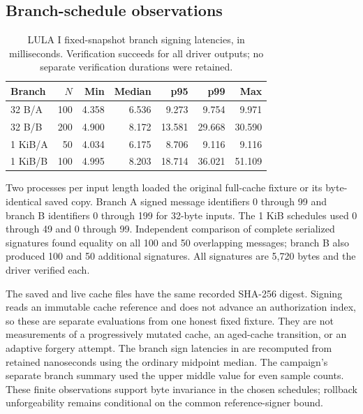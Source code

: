 \subsection{Branch-schedule observations}
\begin{table}[t]
\caption{LULA I fixed-snapshot branch signing latencies, in milliseconds. Verification succeeds for all driver outputs; no separate verification durations were retained.}\label{tab:comparison-branches}
\centering\small\setlength{\tabcolsep}{3pt}
\begin{tabular}{lrrrrrr}\toprule
Branch & $N$ & Min & Median & p95 & p99 & Max\\\midrule
32 B/A & 100 & 4.358 & 6.536 & 9.273 & 9.754 & 9.971\\
32 B/B & 200 & 4.900 & 8.172 & 13.581 & 29.668 & 30.590\\
1 KiB/A & 50 & 4.034 & 6.175 & 8.706 & 9.116 & 9.116\\
1 KiB/B & 100 & 4.995 & 8.203 & 18.714 & 36.021 & 51.109\\
\bottomrule\end{tabular}
\end{table}
Two processes per input length loaded the original full-cache fixture or its byte-identical saved copy. Branch A signed message identifiers 0 through 99 and branch B identifiers 0 through 199 for 32-byte inputs. The 1 KiB schedules used 0 through 49 and 0 through 99. Independent comparison of complete serialized signatures found equality on all 100 and 50 overlapping messages; branch B also produced 100 and 50 additional signatures. All signatures are 5,720 bytes and the driver verified each.

The saved and live cache files have the same recorded SHA-256 digest. Signing reads an immutable cache reference and does not advance an authorization index, so these are separate evaluations from one honest fixed fixture. They are not measurements of a progressively mutated cache, an aged-cache transition, or an adaptive forgery attempt. The branch sign latencies in  are recomputed from retained nanoseconds using the ordinary midpoint median. The campaign's separate branch summary used the upper middle value for even sample counts. These finite observations support byte invariance in the chosen schedules; rollback unforgeability remains conditional on the common reference-signer bound.

